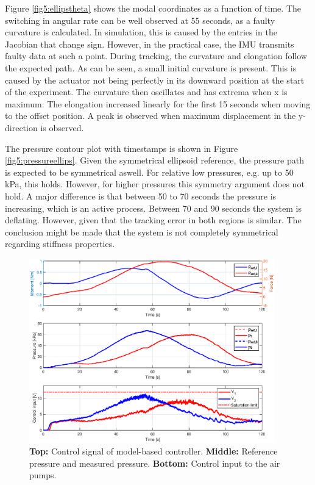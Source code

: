 Figure \ref{fig5:ellipstheta} shows the modal coordinates as a function of time. The switching in angular rate can be well observed at 55 seconds, as a faulty curvature is calculated. In simulation, this is caused by the entries in the Jacobian that change sign. However, in the practical case, the IMU transmits faulty data at such a point. During tracking, the curvature and elongation follow the expected path. As can be seen, a small initial curvature is present. This is caused by the actuator not being perfectly in its downward position at the start of the experiment. The curvature then oscillates and has extrema when x is maximum. The elongation increased linearly for the first 15 seconds when moving to the offset position. A peak is observed when maximum displacement in the y-direction is observed. 

The pressure contour plot with timestamps is shown in Figure \ref{fig5:pressureellips}. Given the symmetrical ellipsoid reference, the pressure path is expected to be symmetrical aswell. For relative low pressures, e.g. up to 50 kPa, this holds. However, for higher pressures this symmetry argument does not hold. A major difference is that between 50 to 70 seconds the pressure is increasing, which is an active process. Between 70 and 90 seconds the system is deflating. However, given that the tracking error in both regions is similar. The conclusion might be made that the system is not completely symmetrical regarding stiffness properties. 




\begin{figure}[H]
    \centering
    \includegraphics[width = 0.95\textwidth]{Figures/Chapter5/input.eps}
    \caption{\textbf{Top:} Control signal of model-based controller. \textbf{Middle:} Reference pressure and measured pressure. \textbf{Bottom:} Control input to the air pumps.}
    \label{fig5:controlellips}
\end{figure}




